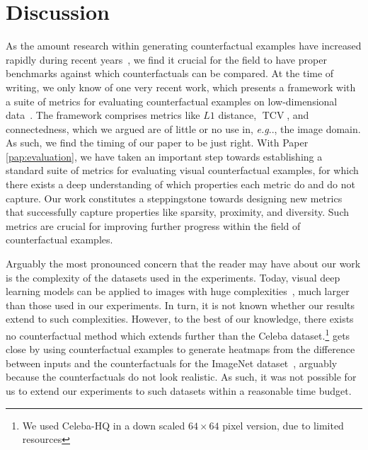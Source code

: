 \documentclass[11pt,a4paper,twoside,openright,final]{memoir}
\makeatletter
\DeclareRobustCommand\onedot{\futurelet\@let@token\@onedot}
\def\@onedot{\ifx\@let@token.\else.\null\fi\xspace}
\def\eg{\emph{e.g}\onedot} \def\Eg{\emph{E.g}\onedot}
\newcommand*{\paperref}[1]{Paper \hyperref[#1]{\ref{#1}}}
\makeatother
\begin{document}
\section{Discussion}
As the amount research within generating counterfactual examples have increased rapidly during recent years~\cite{Stepin2021}, we find it crucial for the field to have proper benchmarks against which counterfactuals can be compared.
At the time of writing, we only know of one very recent work, which presents a framework with a suite of metrics for evaluating counterfactual examples on low-dimensional data~\cite{clara}. 
The framework comprises metrics like $L1$ distance, $\operatorname{TCV}$, and connectedness, which we argued are of little or no use in, \eg, the image domain.
As such, we find the timing of our paper to be just right. 
With \paperref{pap:evaluation}, we have taken an important step towards establishing a standard suite of metrics for evaluating visual counterfactual examples, for which there exists a deep understanding of which properties each metric do and do not capture.
Our work constitutes a steppingstone towards designing new metrics that successfully capture properties like sparsity, proximity, and diversity.
Such metrics are crucial for improving further progress within the field of counterfactual examples.

Arguably the most pronounced concern that the reader may have about our work is the complexity of the datasets used in the experiments. 
Today, visual deep learning models can be applied to images with huge complexities~\cite{biggan, vit}, much larger than those used in our experiments.
In turn, it is not known whether our results extend to such complexities.
However, to the best of our knowledge, there exists no counterfactual method which extends further than the Celeba dataset.\footnote{We used Celeba-HQ in a down scaled $64\times 64$ pixel version, due to limited resources}
\citet{Elliott_2021_CVPR} gets close by using counterfactual examples to generate heatmaps from the difference between inputs and the counterfactuals for the ImageNet dataset~\cite{imagenet}, arguably because the counterfactuals do not look realistic.
As such, it was not possible for us to extend our experiments to such datasets within a reasonable time budget. 
\end{document}
